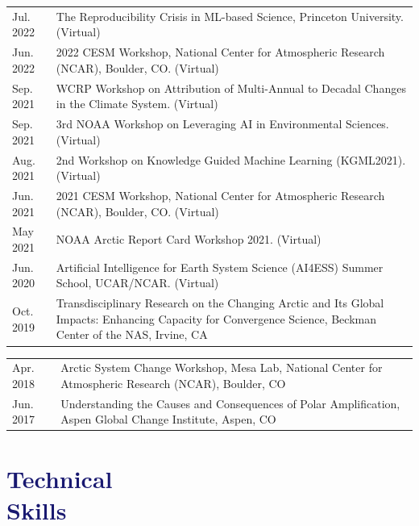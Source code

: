 \documentclass[margin,line,palatino,courier,10pt]{res}
\begin{document}
\begin{resume}
\begin{tabular}{@{}p{0.9in}p{4in}}
Jul. 2022 & The Reproducibility Crisis in ML-based Science, Princeton University. (Virtual)\\
Jun. 2022 & 2022 CESM Workshop, National Center for Atmospheric Research (NCAR), Boulder, CO. (Virtual)\\
Sep. 2021 & WCRP Workshop on Attribution of Multi-Annual to Decadal Changes in the Climate System. (Virtual)\\
Sep. 2021 & 3rd NOAA Workshop on Leveraging AI in Environmental Sciences. (Virtual)\\
Aug. 2021 & 2nd Workshop on Knowledge Guided Machine Learning (KGML2021). (Virtual)\\
Jun. 2021 & 2021 CESM Workshop, National Center for Atmospheric Research (NCAR), Boulder, CO. (Virtual)\\
May 2021 & NOAA Arctic Report Card Workshop 2021. (Virtual)\\
Jun. 2020 & Artificial Intelligence for Earth System Science (AI4ESS) Summer School, UCAR/NCAR. (Virtual)\\
Oct. 2019 & Transdisciplinary Research on the Changing Arctic and Its Global Impacts:  Enhancing Capacity for Convergence Science, Beckman Center of the NAS, Irvine, CA\\
\end{tabular}
\begin{tabular}{@{}p{0.9in}p{4in}}
Apr. 2018 & Arctic System Change Workshop, Mesa Lab, National Center for Atmospheric Research (NCAR), Boulder, CO\\
Jun. 2017 & Understanding the Causes and Consequences of Polar Amplification, Aspen Global Change Institute, Aspen, CO
\end{tabular}

\vspace{-0.1in}
\noindent\textcolor{MidnightBlue}{\makebox[\linewidth][r]{\rule{\textwidth}{5pt}}}
\vspace{-0.3in}
\section{\sc \textcolor{MidnightBlue}{\large{\textbf{Technical \\ Skills}}}}
\vspace*{0.05in}
\begin{tabular}{@{}p{0.9in}p{6in}}


\end{tabular}
\end{resume}
\end{document}
